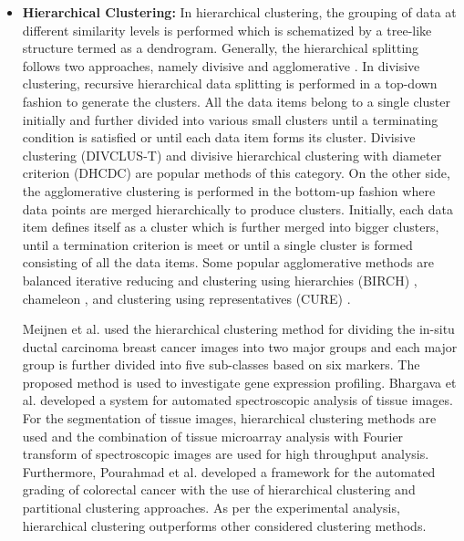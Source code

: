 \begin{itemize}
\item \textbf{Hierarchical Clustering:}
In hierarchical clustering, the grouping of data at different similarity levels is performed which is schematized by a tree-like structure termed as a dendrogram. Generally, the hierarchical splitting follows two approaches, namely divisive and agglomerative \cite{saxena2017review}. In divisive clustering, recursive hierarchical data splitting is performed in a top-down fashion to generate the clusters. All the data items belong to a single cluster initially and  further divided into various small clusters until a terminating condition is satisfied or until each data item forms its cluster. Divisive clustering (DIVCLUS-T) \cite{chavent2007divclus} and divisive hierarchical clustering with diameter criterion (DHCDC) \cite{guenoche1991efficient} are popular methods of this category. On the other side, the agglomerative clustering is performed in the bottom-up fashion where data points are merged hierarchically to produce clusters. Initially, each data item defines itself as a cluster which is further merged into bigger clusters, until a termination criterion is meet or until a single cluster is formed consisting of all the data items. Some popular agglomerative methods are balanced iterative reducing and clustering using hierarchies (BIRCH) \cite{zhang1996birch}, chameleon \cite{karypis1999chameleon}, and clustering using representatives (CURE) \cite{guha1998cure}.

Meijnen et al. \cite{meijnen2008} used the hierarchical clustering method for dividing the in-situ ductal carcinoma breast cancer images into two major groups and each major group is further divided into five sub-classes based on six markers. The proposed method is used to investigate gene expression profiling.  Bhargava et al. \cite{bhargava2006} developed a system for automated spectroscopic analysis of tissue images. For the segmentation of tissue images, hierarchical clustering methods are used and the combination of tissue microarray analysis with Fourier transform of spectroscopic images are used for high throughput analysis. Furthermore, Pourahmad et al. \cite{pourahmad2016} developed a framework for the automated grading of colorectal cancer with the use of hierarchical clustering and partitional clustering approaches. As per the experimental analysis, hierarchical clustering outperforms other considered clustering methods.


\end{itemize}
